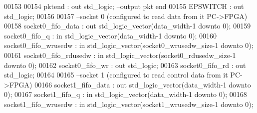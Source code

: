 \begin{DoxyCode}
00153 
00154         pktend              : \textcolor{keywordflow}{out} \textcolor{comment}{std\_logic};                                    \textcolor{keyword}{--output pkt end }
00155         EPSWITCH                    : \textcolor{keywordflow}{out} \textcolor{comment}{std\_logic};
00156         
00157 \textcolor{keyword}{        --socket 0 (configured to read data from it PC->FPGA)}
00158         socket0_fifo_data           : \textcolor{keywordflow}{out} \textcolor{comment}{std\_logic\_vector}(data_width\textcolor{vhdlchar}{-}\textcolor{vhdllogic}{}\textcolor{vhdllogic}{1} \textcolor{keywordflow}{downto} \textcolor{vhdllogic}{}\textcolor{vhdllogic}{0});
00159         socket0_fifo_q              : \textcolor{keywordflow}{in} \textcolor{comment}{std\_logic\_vector}(data_width\textcolor{vhdlchar}{-}\textcolor{vhdllogic}{}\textcolor{vhdllogic}{1} \textcolor{keywordflow}{downto} \textcolor{vhdllogic}{}\textcolor{vhdllogic}{0});
00160         socket0_fifo_wrusedw        : \textcolor{keywordflow}{in} \textcolor{comment}{std\_logic\_vector}(socket0_wrusedw_size\textcolor{vhdlchar}{-}\textcolor{vhdllogic}{}\textcolor{vhdllogic}{1} \textcolor{keywordflow}{downto} \textcolor{vhdllogic}{}\textcolor{vhdllogic}{0});
00161         socket0_fifo_rdusedw        : \textcolor{keywordflow}{in} \textcolor{comment}{std\_logic\_vector}(socket0_rdusedw_size\textcolor{vhdlchar}{-}\textcolor{vhdllogic}{}\textcolor{vhdllogic}{1} \textcolor{keywordflow}{downto} \textcolor{vhdllogic}{}\textcolor{vhdllogic}{0});
00162         socket0_fifo_wr         : \textcolor{keywordflow}{out} \textcolor{comment}{std\_logic};
00163         socket0_fifo_rd         : \textcolor{keywordflow}{out} \textcolor{comment}{std\_logic};
00164 
00165 \textcolor{keyword}{        --socket 1 (configured to read control data from it PC->FPGA)}
00166         socket1_fifo_data           : \textcolor{keywordflow}{out} \textcolor{comment}{std\_logic\_vector}(data_width\textcolor{vhdlchar}{-}\textcolor{vhdllogic}{}\textcolor{vhdllogic}{1} \textcolor{keywordflow}{downto} \textcolor{vhdllogic}{}\textcolor{vhdllogic}{0});
00167         socket1_fifo_q              : \textcolor{keywordflow}{in} \textcolor{comment}{std\_logic\_vector}(data_width\textcolor{vhdlchar}{-}\textcolor{vhdllogic}{}\textcolor{vhdllogic}{1} \textcolor{keywordflow}{downto} \textcolor{vhdllogic}{}\textcolor{vhdllogic}{0});
00168         socket1_fifo_wrusedw        : \textcolor{keywordflow}{in} \textcolor{comment}{std\_logic\_vector}(socket1_wrusedw_size\textcolor{vhdlchar}{-}\textcolor{vhdllogic}{}\textcolor{vhdllogic}{1} \textcolor{keywordflow}{downto} \textcolor{vhdllogic}{}\textcolor{vhdllogic}{0});

\end{DoxyCode}
